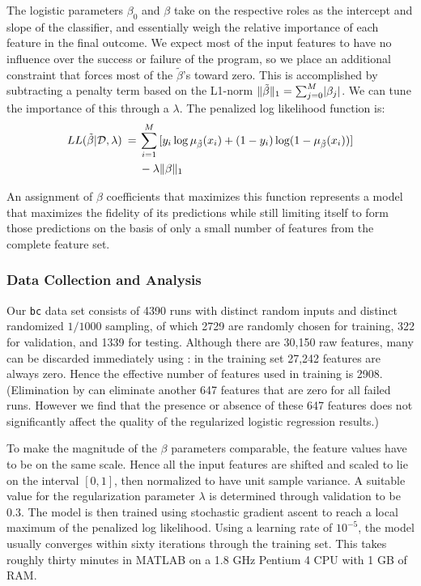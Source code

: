 The logistic parameters $\beta_0$ and $\beta$ take on the respective roles as
the intercept and slope of the classifier, and essentially weigh the
relative importance of each feature in the final outcome.  We expect
most of the input features to have no influence over the success or
failure of the program, so we place an additional constraint that
forces most of the $\tilde{\beta}$'s toward zero.  This is accomplished by
subtracting a penalty term based on the L1-norm $\lVert\tilde{\beta}\rVert_1 =
\sum_{j=0}^M \lvert\beta_j\rvert$.  We can tune the importance of this
 through a  $\lambda$.  The penalized log likelihood function is:
\begin{equation*}
  \begin{split}
    LL (\tilde{\beta} | \mathcal{D}, \lambda ) \:=\:
    & \sum_{i=1}^M \, [y_i \log \mu_{\tilde{\beta}} (x_i) + (1 - y_i) \log (1 - \mu_{\tilde{\beta}} (x_i))] \\
    & - \lambda \lVert\beta\rVert_1
  \end{split}
\end{equation*}

An assignment of $\beta$ coefficients that maximizes this function
represents a model that maximizes the fidelity of its predictions
while still limiting itself to form those predictions on the basis of
only a small number of features from the complete feature set.

\subsubsection{Data Collection and Analysis}

Our \texttt{bc} data set consists of 4390 runs with distinct random
inputs and distinct randomized $1/1000$ sampling, of which 2729 are
randomly chosen for training, 322 for validation, and 1339 for
testing.  Although there are 30,150 raw features, many can be
discarded immediately using :
in the training set 27,242 features are always zero.  Hence the
effective number of features used in training is 2908.  (Elimination
by  can eliminate another 647 features
that are zero for all failed runs.  However we find that the presence
or absence of these 647 features does not significantly affect the
quality of the regularized logistic regression results.)

To make the magnitude of the $\beta$ parameters comparable, the feature
values have to be on the same scale.  Hence all the input features are
shifted and scaled to lie on the interval $[0, 1]$, then normalized to
have unit sample variance.  A suitable value for the regularization
parameter $\lambda$ is determined through validation to be $0.3$.  The model
is then trained using stochastic gradient ascent to reach a local
maximum of the penalized log likelihood.  Using a learning rate of
$10^{-5}$, the model usually converges within sixty iterations through
the training set.  This takes roughly thirty minutes in MATLAB on a
1.8 GHz Pentium 4 CPU with 1 GB of RAM.

